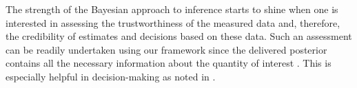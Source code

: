 The strength of the Bayesian approach to inference starts to shine when one is
interested in assessing the trustworthiness of the measured data and, therefore,
the credibility of estimates and decisions based on these data. Such an
assessment can be readily undertaken using our framework since the delivered
posterior contains all the necessary information about the quantity of interest
\g. This is especially helpful in decision-making as noted in
.
